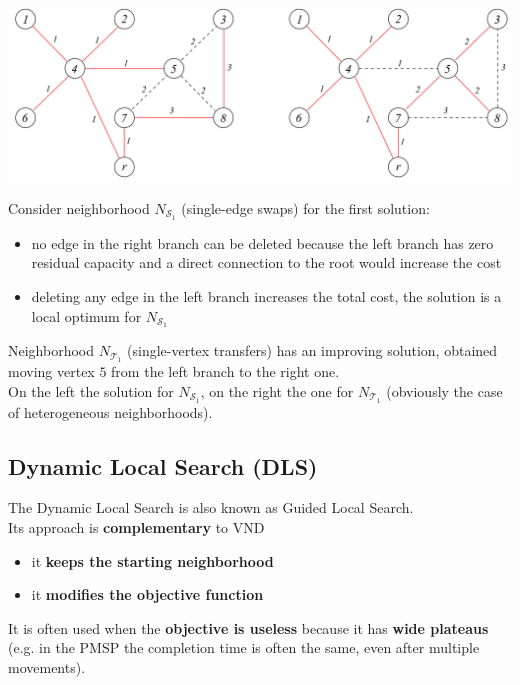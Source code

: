 \begin{center}
	\includegraphics[width=\columnwidth]{img/CMST4}
\end{center}

Consider neighborhood $N_{\mathcal{S}_1}$ (single-edge swaps) for the first solution:
\begin{itemize}
	\item no edge in the right branch can be deleted because the left branch has zero residual capacity and a direct connection to the root would increase the cost
	
	\item deleting any edge in the left branch increases the total cost, the solution is a local optimum for $N_{\mathcal{S}_1}$
\end{itemize} 

Neighborhood $N_{\mathcal{T}_1}$ (single-vertex transfers) has an improving solution, obtained moving vertex $5$ from the left branch to the right one.\\

On the left the solution for $N_{\mathcal{S}_1}$, on the right the one for $N_{\mathcal{T}_1}$ (obviously the case of heterogeneous neighborhoods).\\

\newpage

\subsection{Dynamic Local Search (DLS)}

The Dynamic Local Search is also known as Guided Local Search.\\

Its approach is \textbf{complementary} to VND
\begin{itemize}
	\item it \textbf{keeps the starting neighborhood}
	\item it \textbf{modifies the objective function}
\end{itemize}

It is often used when the \textbf{objective is useless} because it has \textbf{wide plateaus} (e.g. in the PMSP the completion time is often the same, even after multiple movements).\\

